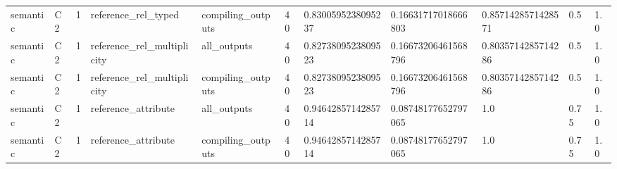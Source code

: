 \begin{tabular}{lllllllllll}
semantic & C2 & 1 & reference\_rel\_typed & compiling\_outputs & 40 & 0.8300595238095237 & 0.16631717018666803 & 0.8571428571428571 & 0.5 & 1.0 \\
semantic & C2 & 1 & reference\_rel\_multiplicity & all\_outputs & 40 & 0.8273809523809523 & 0.16673206461568796 & 0.8035714285714286 & 0.5 & 1.0 \\
semantic & C2 & 1 & reference\_rel\_multiplicity & compiling\_outputs & 40 & 0.8273809523809523 & 0.16673206461568796 & 0.8035714285714286 & 0.5 & 1.0 \\
semantic & C2 & 1 & reference\_attribute & all\_outputs & 40 & 0.9464285714285714 & 0.08748177652797065 & 1.0 & 0.75 & 1.0 \\
semantic & C2 & 1 & reference\_attribute & compiling\_outputs & 40 & 0.9464285714285714 & 0.08748177652797065 & 1.0 & 0.75 & 1.0 \\
\end{tabular}
